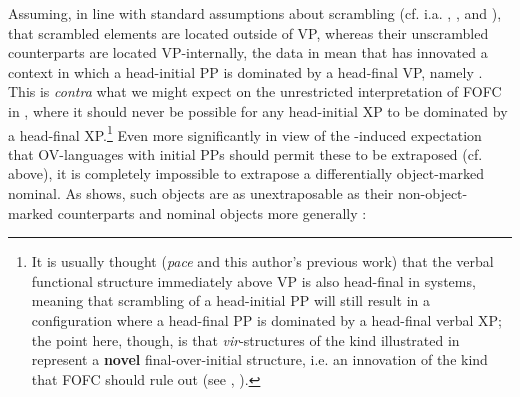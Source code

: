 \documentclass[output=paper]{LSP/langsci}
\begin{document}
Assuming, in line with standard assumptions about  scrambling (cf. i.a. \citealt{Richards2004}, \citealt{Haider2005}, and \citealt{Chocano2007}), that scrambled elements are located outside of VP, whereas their unscrambled counterparts are located VP-internally, the data in  mean that  has innovated a context in which a head-initial PP is dominated by a head-final VP, namely . This is \textit{contra} what we might expect on the unrestricted interpretation of FOFC in , where it should never be possible for any head-initial XP to be dominated by a head-final XP.\footnote{It is usually thought (\textit{pace} \citealt{Haider2013} and this author’s previous work) that the verbal functional structure immediately above VP is also head-final in  systems, meaning that scrambling of a head-initial PP will still result in a configuration where a head-final PP is dominated by a head-final verbal XP; the point here, though, is that \textit{vir}{}-structures of the kind illustrated in  represent a \textbf{novel} final-over-initial structure, i.e. an innovation of the kind that FOFC should rule out (see \citealt{biberaueretal2009}, \citealt{biberaueretal2010}).}  Even more significantly in view of the -induced expectation that OV-languages with initial PPs should permit these to be extraposed (cf.  above), it is completely impossible to extrapose a differentially object-marked nominal. As  shows, such objects are as unextraposable  as their non-object-marked counterparts  and nominal objects more generally :

\ea%
    \label{ex:biberauer:17}
\z
\z
\end{document}
